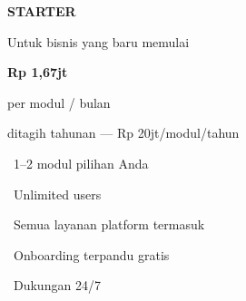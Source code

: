 \documentclass[a4paper]{article}
\begin{document}
\vspace{6pt}

\noindent
\begin{minipage}[t]{0.318\textwidth}
    \colorbox{BlueBg}{%
        \begin{minipage}[t][7.6cm][c]{\dimexpr\linewidth-2\fboxsep\relax}
            \begin{center}
                {\fontsize{11}{14}\selectfont\bfseries\color{BlueDark} STARTER}\par\vspace{2pt}
                {\fontsize{8}{10}\selectfont\color{TextLight} Untuk bisnis yang baru memulai}\par\vspace{8pt}
                {\fontsize{20}{24}\selectfont\bfseries\color{BluePrimary} Rp 1,67jt}\par\vspace{1pt}
                {\fontsize{8}{10}\selectfont\color{TextLight} per modul / bulan}\par\vspace{1pt}
                {\fontsize{7.5}{9}\selectfont\color{TextLight} ditagih tahunan --- Rp 20jt/modul/tahun}\par\vspace{6pt}
            \end{center}
            {\fontsize{8.5}{12}\selectfont\color{TextDark}%
            \textbullet\ 1--2 modul pilihan Anda\par\vspace{2pt}%
            \textbullet\ Unlimited users\par\vspace{2pt}%
            \textbullet\ Semua layanan platform termasuk\par\vspace{2pt}%
            \textbullet\ Onboarding terpandu gratis\par\vspace{2pt}%
            \textbullet\ Dukungan 24/7}%
        \end{minipage}}
\end{minipage}%
\hfill
\end{document}
